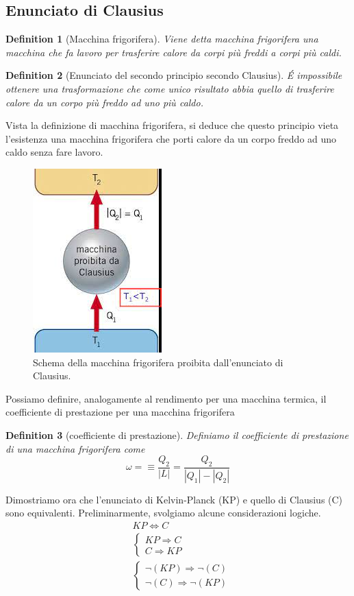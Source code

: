 \documentclass[10pt,a4paper]{article}
\newtheorem{definition}{Definition}
\begin{document}
\subsection{Enunciato di Clausius}
\begin{definition}[Macchina frigorifera]
	Viene detta macchina frigorifera una macchina che fa lavoro per trasferire calore da corpi più freddi a corpi più caldi. 
\end{definition}
\begin{definition}[Enunciato del secondo principio secondo Clausius]
	\'{E} impossibile ottenere una trasformazione che come unico risultato abbia quello di trasferire calore da un corpo più freddo ad uno più caldo. 
\end{definition}
Vista la definizione di macchina frigorifera, si deduce che questo principio vieta l'esistenza una macchina frigorifera che porti calore da un corpo freddo ad uno caldo senza fare lavoro. 
\begin{figure}[h!]
	\centering
	\includegraphics[width=0.3\linewidth]{../images/clausius}
	\caption{Schema della macchina frigorifera proibita dall'enunciato di Clausius.}
	\label{fig:clausius}
\end{figure}
\FloatBarrier
Possiamo definire, analogamente al rendimento per una macchina termica, il coefficiente di prestazione per una macchina frigorifera
\begin{definition}[coefficiente di prestazione]
	Definiamo il coefficiente di prestazione di una macchina frigorifera come \[\omega =\equiv \frac{Q_2}{|L|} = \frac{Q_2}{|Q_1|-|Q_2|}\]
\end{definition}
Dimostriamo ora che l'enunciato di Kelvin-Planck (KP) e quello di Clausius (C) sono equivalenti. Preliminarmente, svolgiamo alcune considerazioni logiche.
\begin{align*}
	&KP \Leftrightarrow C\\
	&\begin{cases}
		KP \Rightarrow C\\
		C \Rightarrow KP
	\end{cases}\\
	&\begin{cases}
		\neg(KP)\Rightarrow \neg(C)\\
		\neg(C)\Rightarrow \neg(KP)
	\end{cases}
\end{align*}
\end{document}
